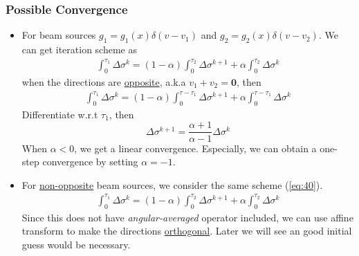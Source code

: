\documentclass[12pt,a4paper]{article}
\begin{document}
\subsubsection{Possible Convergence}
\begin{itemize}
\item For beam sources $g_1 = g_1(x)\delta(v-v_1)$ and $g_2 = g_2(x)\delta(v- v_2)$. We can get iteration scheme as
\begin{eqnarray}\label{eq:40}
\int_0^{\tau_1} \Delta \sigma^k = (1-\alpha) \int_0^{\tau_2}\Delta \sigma^{k+1} + \alpha\int_0^{
\tau_2}\Delta \sigma^k
\end{eqnarray}
when the directions are \underline{opposite}, a.k.a $v_1 + v_2 = \mathbf{0}$, then
\begin{eqnarray}
\int_0^{\tau_1} \Delta \sigma^k = (1-\alpha) \int_0^{\tau - \tau_1}\Delta \sigma^{k+1} +\alpha\int_0^{
\tau - \tau_1}\Delta \sigma^k
\end{eqnarray}
Differentiate w.r.t $\tau_1$, then
\begin{equation}
\Delta \sigma^{k+1} = \dfrac{\alpha+1}{\alpha-1}\Delta\sigma^k
\end{equation}
When $\alpha < 0$, we get a linear convergence. Especially, we can obtain a one-step convergence by setting $\alpha = -1$.
\item For \underline{non-opposite} beam sources, we consider the same scheme (\ref{eq:40}).
\begin{eqnarray}\label{eq:43}
\int_0^{\tau_1} \Delta \sigma^k = (1-\alpha) \int_0^{\tau_2}\Delta \sigma^{k+1} + \alpha\int_0^{
\tau_2}\Delta \sigma^k
\end{eqnarray}
Since this does not have \textit{angular-averaged} operator included, we can use affine transform to make the directions \underline{orthogonal}. Later we will see an good initial guess would be necessary. 


\end{itemize}
\end{document}
